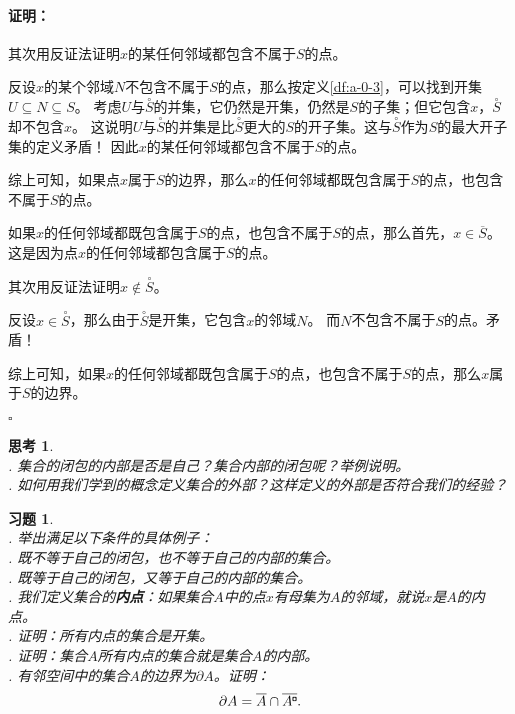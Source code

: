 \documentclass[12pt,UTF8]{ctexbook}
\newcommand{\bu}{\mathbin{\text{\tikz[baseline=-0.6ex]{
    \node[draw, fill=black, minimum size=0.8ex, inner sep=0pt, rectangle] (bu) {};
    \node[draw=none, fill=white, minimum size=0.6ex, inner sep=0pt, circle] at (bu.center) {};
}}}}
\theoremstyle{definition}
\theoremstyle{plain}
\newtheorem{sk}{思考}[section]
\newtheorem{xt}{习题}[section]
\renewenvironment{proof}{\paragraph{\textbf{证明：}}}{\hfill$\square$}
\begin{document}
\begin{appendix}
\begin{proof}
    其次用反证法证明$x$的某任何邻域都包含不属于$S$的点。
    
    反设$x$的某个邻域$N$不包含不属于$S$的点，那么按定义\ref{df:a-0-3}，可以找到开集$U\subseteq N\subseteq S$。
    考虑$U$与$\overset{\circ}{S}$的并集，它仍然是开集，仍然是$S$的子集；但它包含$x$，$\overset{\circ}{S}$却不包含$x$。
    这说明$U$与$\overset{\circ}{S}$的并集是比$\overset{\circ}{S}$更大的$S$的开子集。这与$\overset{\circ}{S}$作为$S$的最大开子集的定义矛盾！
    因此$x$的某任何邻域都包含不属于$S$的点。

    综上可知，如果点$x$属于$S$的边界，那么$x$的任何邻域都既包含属于$S$的点，也包含不属于$S$的点。

    如果$x$的任何邻域都既包含属于$S$的点，也包含不属于$S$的点，那么首先，$x\in \overline{S}$。这是因为点$x$的任何邻域都包含属于$S$的点。
    
    其次用反证法证明$x\notin\overset{\circ}{S}$。
    
    反设$x\in \overset{\circ}{S}$，那么由于$\overset{\circ}{S}$是开集，它包含$x$的邻域$N$。
    而$N$不包含不属于$S$的点。矛盾！

    综上可知，如果$x$的任何邻域都既包含属于$S$的点，也包含不属于$S$的点，那么$x$属于$S$的边界。

\end{proof}

\begin{sk}
    \mbox{} \\
    . 集合的闭包的内部是否是自己？集合内部的闭包呢？举例说明。\\
    . 如何用我们学到的概念定义集合的外部？这样定义的外部是否符合我们的经验？
\end{sk}

\begin{xt}
    \mbox{} \\
    . 举出满足以下条件的具体例子：\\
    . 既不等于自己的闭包，也不等于自己的内部的集合。\\
    . 既等于自己的闭包，又等于自己的内部的集合。\\
    . 我们定义集合的\textbf{内点}：如果集合$A$中的点$x$有母集为$A$的邻域，就说$x$是$A$的内点。\\
    . 证明：所有内点的集合是开集。\\
    . 证明：集合$A$所有内点的集合就是集合$A$的内部。\\
    . 有邻空间中的集合$A$的边界为$\partial A$。证明：
    $$ \partial A = \overline{A} \cap \overline{A^{\bu}}. $$
\end{xt}



\end{appendix}
\end{document}
